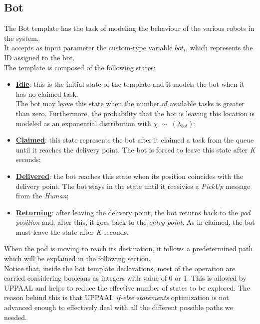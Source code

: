 \documentclass{article}
\begin{document}
		
		\subsection{Bot}
			The Bot template has the task of modeling the behaviour of the various robots in the system. \\
			It accepts as input parameter the custom-type variable $bot_t$, which represents the ID assigned to the bot.\\
			The template is composed of the following states:
			\begin{itemize}
				\item \textbf{\underline{Idle}}: this is the initial state of the template and it models the bot when it has no claimed task.\\The bot may leave this state when the number of available tasks is greater than zero. Furthermore, the probability that the bot is leaving this location is modeled as an exponential distribution with $\chi\;\sim\;(\lambda_{bot})$;
				\item \textbf{\underline{Claimed}}: this state represents the bot after it claimed a task from the queue until it reaches the delivery point. The bot is forced to leave this state after \emph{K} seconds;
				\item \textbf{\underline{Delivered}}: the bot reaches this state when its position coincides with the delivery point. The bot stays in the state until it receivies a \emph{PickUp} message from the \emph{Human};
				\item \textbf{\underline{Returning}}: after leaving the delivery point, the bot returns back to the \emph{pod position} and, after this, it goes back to the \emph{entry point}. As in claimed, the bot must leave the state after \emph{K} seconds.
			\end{itemize}
			When the pod is moving to reach its destination, it follows a predetermined path which will be explained in the following section.\\
			Notice that, inside the bot template declarations, most of the operation are carried considering booleans as integers with value of 0 or 1. This is allowed by UPPAAL and helps to reduce the effective number of states to be explored. The reason behind this is that UPPAAL \emph{if-else statements} optimization is not advanced enough to effectively deal with all the different possible paths we needed. 
			
\end{document}
